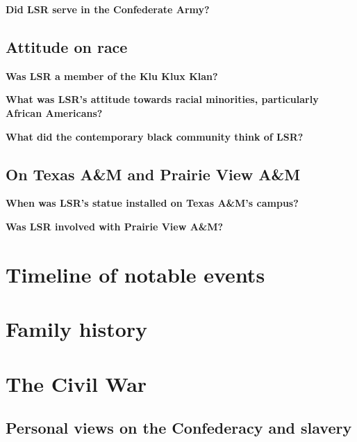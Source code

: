 \documentclass[12pt]{article}
\begin{document}
\textbf{Did LSR serve in the Confederate Army? \\ }

\subsection{Attitude on race}
\textbf{Was LSR a member of the Klu Klux Klan? \\ }

\textbf{What was LSR's attitude towards racial minorities, particularly African Americans? \\ }

\textbf{What did the contemporary black community think of LSR? \\ }

\subsection{On Texas A\&M and Prairie View A\&M}
\textbf{When was LSR's statue installed on Texas A\&M's campus? \\ }

\textbf{Was LSR involved with Prairie View A\&M? \\ }

\newpage
\section{Timeline of notable events}

\newpage
\section{Family history}

\newpage
\section{The Civil War}

\subsection{Personal views on the Confederacy and slavery}
\end{document}
